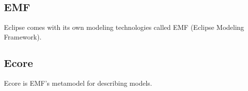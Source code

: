\subsection{EMF}

Eclipse comes with its own modeling technologies called EMF (Eclipse Modeling Framework). 

\subsection{Ecore}

Ecore is EMF's metamodel for describing models. 

\subsection{\eiq}


